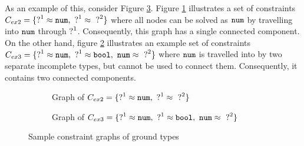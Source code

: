 As an example of this, consider Figure \ref{fig:ex2ex3graphs}. Figure \ref{fig:reachable-tag} illustrates a set of constraints $C_{ex2} = \{ \mathtt{?}^{1} \approx \mathtt{num}, ~ \mathtt{?}^{1} \approx~ \mathtt{?}^{2}\}$ where all nodes can be solved as $\mathtt{num}$ by travelling into $\mathtt{num}$ through $\mathtt{?}^1$. Consequently, this graph has a single connected component. On the other hand, figure  \ref{fig:disjoint-nodes} illustrates an example set of constraints $C_{ex3} = \{ \mathtt{?}^1 \approx \mathtt{num}, ~ \mathtt{?}^1 \approx \mathtt{bool}, ~ \mathtt{num} \approx~ \mathtt{?}^2\}$ where $\mathtt{num}$ is travelled into by two separate incomplete types, but cannot be used to connect them. Consequently, it contains two connected components. 

\begin{figure}[htb!]
\centering
\begin{subfigure}{.49\textwidth}
  \centering
  \caption{Graph of $C_{ex2} = \{ \mathtt{?}^{1} \approx \mathtt{num}, ~ \mathtt{?}^{1} \approx~ \mathtt{?}^{2}\}$}
  \label{fig:reachable-tag}
\end{subfigure}
\begin{subfigure}{.49\textwidth}
  \centering
  \caption{Graph of $C_{ex3} = \{ \mathtt{?}^1 \approx \mathtt{num}, ~ \mathtt{?}^1 \approx \mathtt{bool}, ~ \mathtt{num} \approx~ \mathtt{?}^2\}$}
  \label{fig:disjoint-nodes}
\end{subfigure}
\caption{Sample constraint graphs of ground types}
\label{fig:ex2ex3graphs}
\end{figure}

